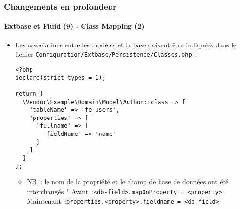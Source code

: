 
\begin{frame}[fragile]
	\frametitle{Changements en profondeur}
	\framesubtitle{Extbase et Fluid (9) - Class Mapping (2)}

	\lstset{basicstyle=\tiny\ttfamily}

	\begin{itemize}
		\item Les associations entre les modèles et la base doivent être indiquées dans le fichier
			\texttt{Configuration/Extbase/Persistence/Classes.php}~:
\begin{lstlisting}
<?php
declare(strict_types = 1);

return [
  \Vendor\Example\Domain\Model\Author::class => [
    'tableName' => 'fe_users',
    'properties' => [
      'fullname' => [
        'fieldName' => 'name'
      ]
    ]
  ]
];
\end{lstlisting}

		\begin{itemize}\smaller
			\item[\ding{228}] NB~: le nom de la propriété et le champ de base de données ont été interchangés~!\newline
				Avant~:\tabto{1.6cm}\texttt{<db-field>.mapOnProperty = <property>}\newline
				Maintenant~:\tabto{1.6cm}\texttt{properties.<property>.fieldname = <db-field>}
		\end{itemize}\normalsize

	\end{itemize}

\end{frame}


